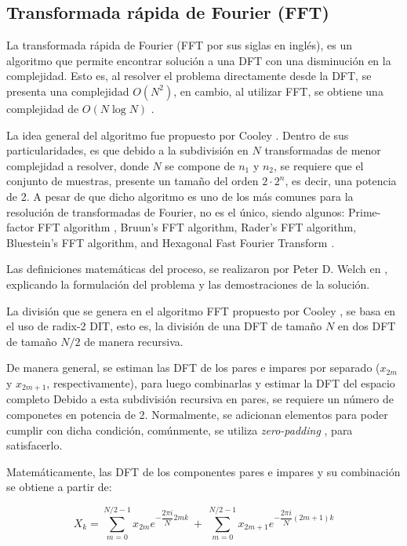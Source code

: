 \subsection{Transformada rápida de Fourier (FFT)}

La transformada rápida de Fourier (FFT por sus siglas en inglés), es un algoritmo que permite encontrar solución a una DFT con una disminución en la complejidad. Esto es, al resolver el problema directamente desde la DFT, se presenta una complejidad $O(N^2)$, en cambio, al utilizar FFT, se obtiene una complejidad de $O(N\log N)$ \cite{welch1967use}.

La idea general del algoritmo fue propuesto por Cooley \cite{cooley1970fast}. Dentro de sus particularidades, es que debido a la subdivisión en $N$ transformadas de menor complejidad a resolver, donde $N$ se compone de $n_1$ y $n_2$, se requiere que el conjunto de muestras, presente un tamaño del orden $2\cdot 2^n$, es decir, una potencia de 2. A pesar de que dicho algoritmo es uno de los más comunes para la resolución de transformadas de Fourier, no es el único, siendo algunos: Prime-factor FFT algorithm \cite{kolba1977prime}, Bruun's FFT algorithm, Rader's FFT algorithm, Bluestein's FFT algorithm, and Hexagonal Fast Fourier Transform \cite{cui2005some}.

Las definiciones matemáticas del proceso, se realizaron por Peter D. Welch en \cite{welch1967use}, explicando la formulación del problema y las demostraciones de la solución. 

La división que se genera en el algoritmo FFT propuesto por Cooley \cite{cooley1970fast}, se basa en el uso de radix-2 DIT, esto es, la división de una DFT de tamaño $N$ en dos DFT de tamaño $N/2$ de manera recursiva.

De manera general, se estiman las DFT de los pares e impares por separado ($x_{2m}$ y $x_{2m+1}$, respectivamente), para luego combinarlas y estimar la DFT del espacio completo Debido a esta subdivisión recursiva en pares, se requiere un número de componetes en potencia de 2. Normalmente, se adicionan elementos para poder cumplir con dicha condición, comúnmente, se utiliza \textit{zero-padding} \cite{muquet2002cyclic}, para satisfacerlo.

Matemáticamente, las DFT de los componentes pares e impares y su combinación se obtiene a partir de:

\begin{equation}
	X_{k} = \sum_{m=0}^{N/2 -1} x_{2m} e ^{-\dfrac{2\pi i}{N}2mk}\ +\ \sum_{m=0}^{N/2 -1} x_{2m+1} e ^{-\dfrac{2\pi i}{N}(2m+1)k} 
	\label{tran3}
\end{equation}  

